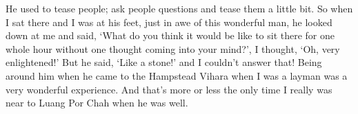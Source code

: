 He used to tease people; ask people questions and tease them a little
bit. So when I sat there and I was at his feet, just in awe of this
wonderful man, he looked down at me and said, `What do you think it
would be like to sit there for one whole hour without one thought coming
into your mind?', I thought, `Oh, very enlightened!' But he said, `Like
a stone!' and I couldn't answer that! Being around him when he came to
the Hampstead Vihara when I was a layman was a very wonderful
experience. And that's more or less the only time I really was near to
Luang Por Chah when he was well.

